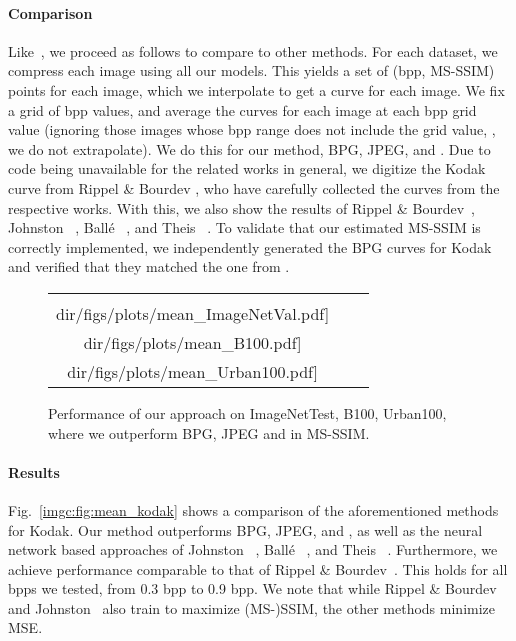 \paragraph{Comparison} Like~\cite{rippel17a}, we proceed as follows to compare to other methods. For each dataset, we compress each image using all our models. This yields a set of (bpp, MS-SSIM) points for each image, which we interpolate to get a curve for each image. We fix a grid of bpp values, and average the curves for each image at each bpp grid value (ignoring those images whose bpp range does not include the grid value, \ie, we do not extrapolate). We do this for our method, BPG, JPEG, and \jpegk. 
Due to code being unavailable for the related works in general, we digitize the Kodak curve from Rippel \& Bourdev \cite{rippel17a}, who have carefully collected the curves from the respective works.
With this, we also show the results of Rippel \& Bourdev~\cite{rippel17a}, Johnston \etal~\cite{johnston2018improved}, Ballé \etal~\cite{balle2016end}, and Theis \etal~\cite{theis2017lossy}.  To validate that our estimated MS-SSIM is correctly implemented, we independently generated the BPG curves for Kodak and verified that they matched the one from \cite{rippel17a}.

\begin{figure}
\centering
\setlength{\tabcolsep}{1pt}
\begin{tabular}{ccc}
    \texttt{[image: \\dir/figs/plots/mean\_ImageNetVal.pdf]}&
    \texttt{[image: \\dir/figs/plots/mean\_B100.pdf]}&
    \texttt{[image: \\dir/figs/plots/mean\_Urban100.pdf]}\\
\end{tabular}
\caption{Performance of our approach on ImageNetTest, B100, Urban100, where we outperform BPG, JPEG and \jpegk in MS-SSIM.}
\label{imgc:fig:comp_imgnet_b100_u100}
\end{figure}

\paragraph{Results} Fig.~\ref{imgc:fig:mean_kodak} shows a comparison of the aforementioned methods for Kodak. Our method outperforms BPG, JPEG, and \jpegk, as well as the neural network based approaches of Johnston \etal~\cite{johnston2018improved}, Ballé \etal~\cite{balle2016end}, and Theis \etal~\cite{theis2017lossy}. Furthermore, we achieve performance comparable to that of Rippel \& Bourdev~\cite{rippel17a}. This holds for all bpps we tested, from 0.3 bpp to 0.9 bpp. We note that while Rippel \& Bourdev and Johnston \etal~also train to maximize (MS-)SSIM, the other methods minimize MSE.

